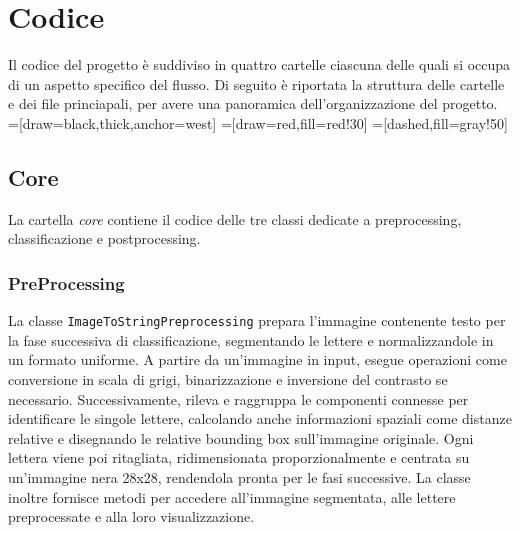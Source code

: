 \chapter{Codice}
Il codice del progetto è suddiviso in quattro cartelle ciascuna delle quali si occupa di un aspetto specifico del flusso. Di seguito è riportata la struttura delle cartelle e dei file princiapali, per avere una panoramica dell'organizzazione del progetto. \\ 

=[draw=black,thick,anchor=west]
=[draw=red,fill=red!30]
=[dashed,fill=gray!50]

\section{Core}
La cartella \emph{core} contiene il codice delle tre classi dedicate a preprocessing, classificazione e postprocessing.

\subsection{PreProcessing}
La classe \texttt{ImageToStringPreprocessing} prepara l'immagine contenente testo per la fase successiva di classificazione, segmentando le lettere e normalizzandole in un formato uniforme. A partire da un'immagine in input, esegue operazioni come conversione in scala di grigi, binarizzazione e inversione del contrasto se necessario. 
Successivamente, rileva e raggruppa le componenti connesse per identificare le singole lettere, calcolando anche informazioni spaziali come distanze relative e disegnando le relative bounding box sull'immagine originale.
Ogni lettera viene poi ritagliata, ridimensionata proporzionalmente e centrata su un'immagine nera 28x28, rendendola pronta per le fasi successive. La classe inoltre fornisce metodi per accedere all'immagine segmentata, alle lettere preprocessate e alla loro visualizzazione.

